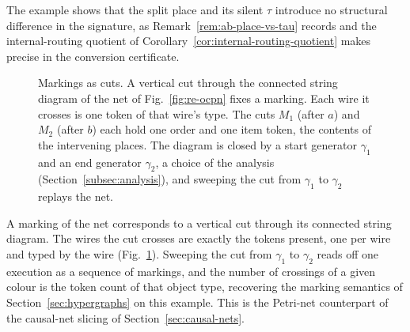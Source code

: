 The example shows that the split place and its silent $\tau$
introduce no structural difference in the signature, as
Remark~\ref{rem:ab-place-vs-tau} records and the internal-routing quotient of
Corollary~\ref{cor:internal-routing-quotient} makes precise in the conversion
certificate.

\begin{figure}[tp]
  \centering
  \unskip
  \caption{Markings as cuts. A vertical cut through the connected string diagram of
    the net of Fig.~\ref{fig:re-ocpn} fixes a marking. Each wire it crosses is one
    token of that wire's type. The cuts $M_1$ (after $a$) and $M_2$ (after $b$) each
    hold one order and one item token, the contents of the intervening places.
    The diagram is closed by a start generator $\gamma_1$ and an end generator $\gamma_2$, a
    choice of the analysis (Section~\ref{subsec:analysis}), and sweeping the cut from $\gamma_1$
    to $\gamma_2$ replays the net.}
  \label{fig:re-pn-slice}
\end{figure}

\begin{remark}\label{rem:pn-marking-cut}
  A marking of the net corresponds to a vertical cut through its connected string
  diagram. The wires the cut crosses are exactly the tokens present, one per wire and
  typed by the wire (Fig.~\ref{fig:re-pn-slice}). Sweeping the cut from $\gamma_1$ to
  $\gamma_2$ reads off one execution as a sequence of markings, and the number of
  crossings of a given colour is the token count of that object type, recovering the
  marking semantics of Section~\ref{sec:hypergraphs} on this example. This is the
  Petri-net counterpart of the causal-net slicing of Section~\ref{sec:causal-nets}.
\end{remark}

